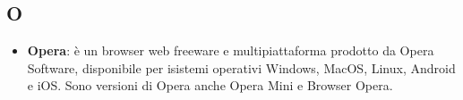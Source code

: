 \subsection{O}
\begin{itemize}
	\item
	\textbf{Opera}: è un browser web freeware e multipiattaforma prodotto da Opera Software, disponibile per isistemi operativi Windows, MacOS, Linux, Android e iOS. Sono versioni di Opera anche Opera Mini e Browser Opera.
\end{itemize}
